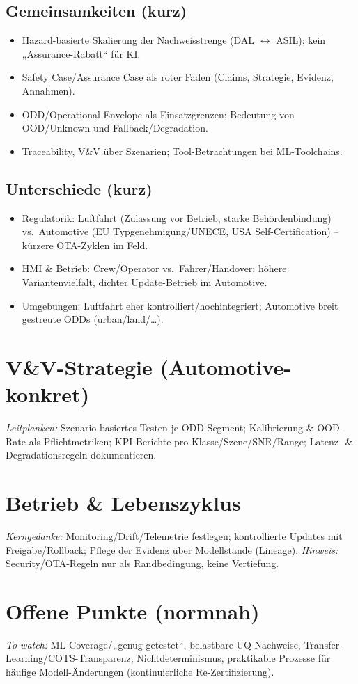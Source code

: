 \subsection{Gemeinsamkeiten (kurz)}
\begin{itemize}
  \item Hazard-basierte Skalierung der Nachweisstrenge (DAL \(\leftrightarrow\) ASIL); kein „Assurance-Rabatt“ für KI.
  \item Safety Case/Assurance Case als roter Faden (Claims, Strategie, Evidenz, Annahmen).
  \item ODD/Operational Envelope als Einsatzgrenzen; Bedeutung von OOD/Unknown und Fallback/Degradation.
  \item Traceability, V\&V über Szenarien; Tool-Betrachtungen bei ML-Toolchains.
\end{itemize}

\subsection{Unterschiede (kurz)}
\begin{itemize}
  \item Regulatorik: Luftfahrt (Zulassung vor Betrieb, starke Behördenbindung) vs.\ Automotive (EU Typgenehmigung/UNECE, USA Self-Certification) – kürzere OTA-Zyklen im Feld.
  \item HMI \& Betrieb: Crew/Operator vs.\ Fahrer/Handover; höhere Variantenvielfalt, dichter Update-Betrieb im Automotive.
  \item Umgebungen: Luftfahrt eher kontrolliert/hochintegriert; Automotive breit gestreute ODDs (urban/land/\ldots).
\end{itemize}



\section{V\&V-Strategie (Automotive-konkret)}
\textit{Leitplanken:} Szenario-basiertes Testen je ODD-Segment; Kalibrierung \& OOD-Rate als Pflichtmetriken; KPI-Berichte pro Klasse/Szene/SNR/Range; Latenz- \& Degradationsregeln dokumentieren.

\section{Betrieb \& Lebenszyklus}
\textit{Kerngedanke:} Monitoring/Drift/Telemetrie festlegen; kontrollierte Updates mit Freigabe/Rollback; Pflege der Evidenz über Modellstände (Lineage). 
\textit{Hinweis:} Security/OTA-Regeln nur als Randbedingung, keine Vertiefung.

\section{Offene Punkte (normnah)}
\textit{To watch:} ML-Coverage/„genug getestet“, belastbare UQ-Nachweise, Transfer-Learning/COTS-Transparenz, Nichtdeterminismus, praktikable Prozesse für häufige Modell-Änderungen (kontinuierliche Re-Zertifizierung).
